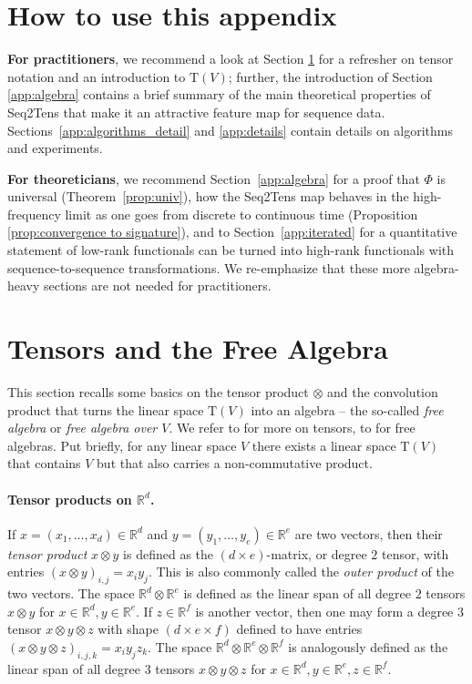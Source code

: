 \documentclass{article} \usepackage{iclr2021_conference,times}
\newcommand{\R}{\mathbb{R}}
\newcommand{\T}[1]{\mathrm{T}({#1})}
\theoremstyle{plain}
\theoremstyle{definition}
\begin{document}
\newpage




\newpage
\appendix
\section*{How to use this appendix}


\textbf{For practitioners}, we recommend a look at Section \ref{app:tensor} for a refresher on tensor notation and an introduction to $\T{V}$;
further, the introduction of Section \ref{app:algebra} contains a brief summary of the main theoretical properties of Seq2Tens that make it an attractive feature map for sequence data.
Sections~\ref{app:algorithms_detail} and \ref{app:details} contain details on algorithms and experiments.


\textbf{For theoreticians}, we recommend Section~\ref{app:algebra} for a proof that $\Phi$ is universal (Theorem~\ref{prop:univ}), how the Seq2Tens map behaves in the high-frequency limit as one goes from discrete to continuous time (Proposition \ref{prop:convergence to signature}), and to Section~\ref{app:iterated} for a quantitative statement of low-rank functionals can be turned into high-rank functionals with sequence-to-sequence transformations. 
We re-emphasize that these more algebra-heavy sections are not needed for practitioners.

\section{Tensors and the Free Algebra}\label{app:tensor}


This section recalls some basics on the tensor product $\otimes$ and the convolution product that turns the linear space $\T{V}$ into an algebra -- the so-called \emph{free algebra} or \emph{free algebra over $V$}. 
  We refer to \cite[Chapter 16]{Lang} for more on tensors, to \citet{Reutenauer93} for free algebras.
  Put briefly, for any linear space $V$ there exists a linear space $\T{V}$ that contains $V$ but that also carries a non-commutative product.
\paragraph{Tensor products on $\R^d$.}
	If $ x = (x_1, \ldots, x_d) \in \R^d $ and $ y = (y_1, \ldots, y_e) \in \R^e $ are two vectors, then their \emph{tensor product} $ x \otimes y $ is defined as the $ (d\times e) $-matrix, or degree $ 2 $ tensor, with entries $ (x \otimes y)_{i,j} = x_iy_j $. This is also commonly called the \emph{outer product} of the two vectors. The space $ \R^d \otimes \R^e $ is defined as the linear span of all degree $ 2 $ tensors $ x \otimes y $ for $ x \in \R^d, y \in \R^e $.
	If $ z \in \R^f $ is another vector, then one may form a degree $ 3 $ tensor $ x \otimes y \otimes z $ with shape $ (d\times e \times f) $ defined to have entries $ (x \otimes y \otimes z)_{i,j,k} = x_iy_jz_k $. The space $ \R^d \otimes \R^e \otimes \R^f $ is analogously defined as the linear span of all degree $ 3 $ tensors $ x \otimes y \otimes z $ for $ x \in \R^d, y \in \R^e, z \in \R^f $.	
	
\end{document}
